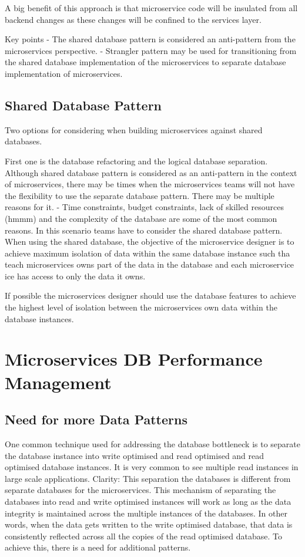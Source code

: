 A big benefit of this approach is that microservice code will be insulated from all backend changes as these changes will be confined to the services layer.

Key points
- The shared database pattern is considered an anti-pattern from the microservices perspective.
- Strangler pattern may be used for transitioning from the shared database implementation of the microservices to separate database implementation of microservices.

\section{Shared Database Pattern}
Two options for considering when building microservices against shared databases.

First one is the database refactoring and the logical database separation.
Although shared database pattern is considered as an anti-pattern in the context of microservices, there may be times when the microservices teams will not have the flexibility to use the separate database pattern.
There may be multiple reasons for it.
- Time constraints, budget constraints, lack of skilled resources (hmmm) and the complexity of the database are some of the most common reasons.
In this scenario teams have to consider the shared database pattern.
When using the shared database, the objective of the microservice designer is to achieve maximum isolation of data within the same database instance such tha teach microservices owns part of the data in the database and each microservice ice has access to only the data it owns.

If possible the microservices designer should use the database features to achieve the highest level of isolation between the microservices own data within the database instances.

\chapter{Microservices DB Performance Management}
\section{Need for more Data Patterns}
One common technique used for addressing the database bottleneck is to separate the database instance into write optimised and read optimised and read optimised database instances.
It is very common to see multiple read instances in large scale applications.
Clarity: This separation the databases is different from separate databases for the microservices.
This mechanism of separating the databases into read and write optimised instances will work as long as the data integrity is maintained across the multiple instances of the databases.
In other words, when the data gets written to the write optimised database, that data is consistently reflected across all the copies of the read optimised database.
To achieve this, there is a need for additional patterns.

